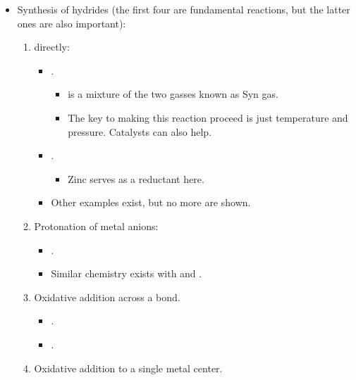 \documentclass[../notes.tex]{subfiles}
\begin{document}
\begin{itemize}
\begin{itemize}
\begin{itemize}
        \end{itemize}
    \end{itemize}
    \item Synthesis of hydrides (the first four are fundamental reactions, but the latter ones are also important):
    \begin{enumerate}
        \item {} directly:
        \begin{itemize}
            \item {}.
            \begin{itemize}
                \item \ce{[CO + H2]} is a mixture of the two gasses known as Syn gas.
                \item The key to making this reaction proceed is just temperature and pressure. Catalysts can also help.
            \end{itemize}
            \item {}.
            \begin{itemize}
                \item Zinc serves as a reductant here.
            \end{itemize}
            \item Other examples exist, but no more are shown.
        \end{itemize}
        \item Protonation of metal anions:
        \begin{itemize}
            \item {}.
            \item Similar chemistry exists with  and .
        \end{itemize}
        \item Oxidative addition across a  bond.
        \begin{itemize}
            \item {}.
            \item {}.
        \end{itemize}
        \item Oxidative addition to a single metal center.
        \begin{itemize}

\end{itemize}
\end{enumerate}
\end{itemize}
\end{document}
